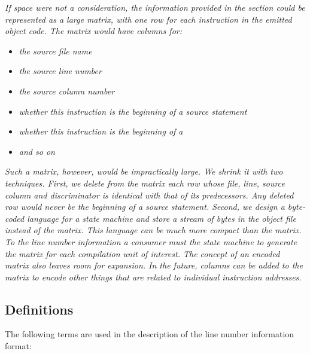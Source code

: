 \textit{If space were not a consideration, the information provided
in the \dotdebugline{} 
section could be represented as a large
matrix, with one row for each instruction in the emitted
object code. The matrix would have columns for:}
\begin{itemize}
\item \textit{the source file name}
\item \textit{the source line number}
\item \textit{the source column number}
\item \textit{whether this instruction is the beginning of a source statement}
\item \textit{whether this instruction is the beginning of a }
\item \textit{and so on}
\end{itemize}
\textit{Such a matrix, however, would be impractically large. We
shrink it with two techniques. First, we delete from
the matrix each row whose file, line, source column and
discriminator 
is identical with that of its
predecessors. Any deleted row would never be the beginning of
a source statement. Second, we design a byte-coded language
for a state machine and store a stream of bytes in the object
file instead of the matrix. This language can be much more
compact than the matrix. To the line number information a 
consumer must  the state machine
to generate the matrix for each compilation unit of interest.
The concept of an encoded matrix also leaves
room for expansion. In the future, columns can be added to the
matrix to encode other things that are related to individual
instruction addresses.}

\subsection{Definitions}
\label{chap:definitions}
The following terms are used in the description of the line
number information format:

